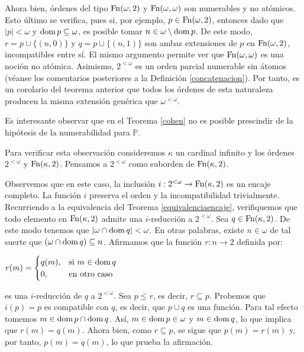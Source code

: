 \documentclass[11pt]{unam_tesis1}
\theoremstyle{MyThmStyle}
\theoremstyle{definition}
\theoremstyle{plain}
\theoremstyle{remark}
\def\dom{\mathop{\rm dom}\nolimits}
\let\leq\leqslant
\begin{document}
Ahora bien, \'ordenes del tipo ${\rm Fn}(\omega,2)$ y ${\rm Fn}(\omega,\omega)$ son numerables y no at\'omicos. Esto \'ultimo se verifica, pues si, por ejemplo, $p\in {\rm Fn}(\omega,2)$, entonces dado que $|p|<\omega$ y $\dom p\subseteq \omega$, es posible tomar $n\in \omega\setminus \dom p$. De este modo, $r=p\cup \{(n,0) \}$ y $q=p\cup \{(n,1)\}$ son ambas extensiones de $p$ en ${\rm Fn}(\omega,2)$, incompatibles entre s\'i. El mismo argumento permite ver que ${\rm Fn}(\omega,\omega)$ es una noci\'on no at\'omica. Asimismo, $2^{<\omega}$ es un orden parcial numerable sin \'atomos (v\'eanse los comentarios posteriores a la Definici\'on \ref{concatenacion}). Por tanto, es un corolario del teorema anterior que todos los \'ordenes de esta naturaleza producen la misma extensi\'on gen\'erica que $\omega^{<\omega}$.

Es interesante observar que en el Teorema \ref{cohen} no es posible prescindir de la hip\'otesis de la numerabilidad para $\mathbb P$.

Para verificar esta observaci\'on consideremos $\kappa$ un cardinal infinito y los \'ordenes $2^{<\omega}$ y ${\rm Fn}(\kappa,2)$. Pensamos a $2^{<\omega}$ como suborden de ${\rm Fn}(\kappa,2)$.

Observemos que en este caso, la inclusi\'on $i:2^{<\omega}\to {\rm Fn}(\kappa,2)$ es un encaje completo. La funci\'on $i$ preserva el orden y la incompatibilidad trivialmente. Recurriendo a la equivalencia del Teorema \ref{equivalenciaencaje}, verifiquemos que todo elemento en ${\rm Fn}(\kappa,2)$ admite una $i$-reducci\'on a $2^{<\omega}$. Sea $q\in {\rm Fn}(\kappa,2)$. De este modo tenemos que $|\omega\cap \dom q|<\omega$. En otras palabras, existe $n\in \omega$ de tal suerte que $(\omega \cap \dom q)\subseteq n$. Afirmamos que la funci\'on $r:n\to 2$ definida por:

\begin{center}
$r(m) = \begin{cases} q(m), & \mbox{si } m\mbox{  $\in \dom q$} \\ 0, & \mbox{en otro caso } \end{cases}$
\end{center}
es una $i$-reducci\'on de $q$ a $2^{<\omega}$. Sea $p\leq r$, es decir, $r\subseteq p$. Probemos que $i(p)=p$ es compatible con $q$, es decir, que $p\cup q$ es una funci\'on. Para tal efecto tomemos $m\in \dom p\cap \dom q$. As\'i, $m\in \dom p\in \omega$ y $m\in \dom q$, lo que implica que $r(m)=q(m)$. Ahora bien, como $r\subseteq p$, se sigue que $p(m)=r(m)$ y, por tanto, $p(m)=q(m)$, lo que prueba la afirmaci\'on.
\end{document}
